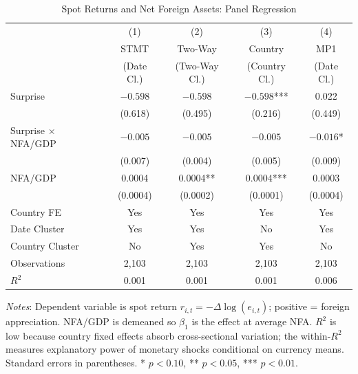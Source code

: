 \documentclass[12pt]{article}
\begin{document}
\begin{table}
\centering
\caption{Spot Returns and Net Foreign Assets: Panel Regression}
\label{tab:nfa_panel}
\begin{tabular}{lcccc}
\toprule
 & (1) & (2) & (3) & (4) \\
 & STMT & Two-Way & Country & MP1 \\
 & (Date Cl.) & (Two-Way Cl.) & (Country Cl.) & (Date Cl.) \\
\midrule
Surprise & $-0.598$ & $-0.598$ & $-0.598$*** & 0.022 \\
 & (0.618) & (0.495) & (0.216) & (0.449) \\
Surprise $\times$ NFA/GDP & $-0.005$ & $-0.005$ & $-0.005$ & $-0.016$* \\
 & (0.007) & (0.004) & (0.005) & (0.009) \\
NFA/GDP & 0.0004 & 0.0004** & 0.0004*** & 0.0003 \\
 & (0.0004) & (0.0002) & (0.0001) & (0.0004) \\
\midrule
Country FE & Yes & Yes & Yes & Yes \\
Date Cluster & Yes & Yes & No & Yes \\
Country Cluster & No & Yes & Yes & No \\
Observations & 2,103 & 2,103 & 2,103 & 2,103 \\
$R^2$ & 0.001 & 0.001 & 0.001 & 0.006 \\
\bottomrule
\end{tabular}
\begin{flushleft}
\footnotesize \textit{Notes}: Dependent variable is spot return $r_{i,t} = -\Delta\log(e_{i,t})$; positive = foreign appreciation. NFA/GDP is demeaned so $\beta_1$ is the effect at average NFA. $R^2$ is low because country fixed effects absorb cross-sectional variation; the within-$R^2$ measures explanatory power of monetary shocks conditional on currency means. Standard errors in parentheses. * $p<0.10$, ** $p<0.05$, *** $p<0.01$.
\end{flushleft}
\end{table}
\end{document}
